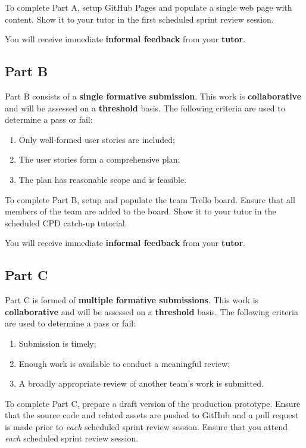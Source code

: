 \documentclass{../fal_assignment}
\begin{document}
To complete Part A, setup GitHub Pages and populate a single web page with content. Show it to your tutor in the first scheduled sprint review session.

You will receive immediate \textbf{informal feedback} from your \textbf{tutor}.

\subsection*{Part B}

Part B consists of a \textbf{single formative submission}. This work is \textbf{collaborative} and will be assessed on a \textbf{threshold} basis. The following criteria are used to determine a pass or fail:

\begin{enumerate}[label=(\alph*)]
	\item Only well-formed user stories are included;
	\item The user stories form a comprehensive plan;
	\item The plan has reasonable scope and is feasible.
\end{enumerate}

To complete Part B, setup and populate the team Trello board. Ensure that all members of the team are added to the board. Show it to your tutor in the scheduled CPD catch-up tutorial.

You will receive immediate \textbf{informal feedback} from your \textbf{tutor}.

\subsection*{Part C}

Part C is formed of \textbf{multiple formative submissions}. This work is \textbf{collaborative} and will be assessed on a \textbf{threshold} basis. The following criteria are used to determine a pass or fail:

\begin{enumerate}[label=(\alph*)]
	\item Submission is timely;
	\item Enough work is available to conduct a meaningful review;
	\item A broadly appropriate review of another team's work is submitted.
\end{enumerate}

To complete Part C, prepare a draft version of the production prototype. Ensure that the source code and related assets are pushed to GitHub and a pull request is made prior to \textit{each} scheduled sprint review session. Ensure that you attend \textit{each} scheduled sprint review session.
\end{document}
